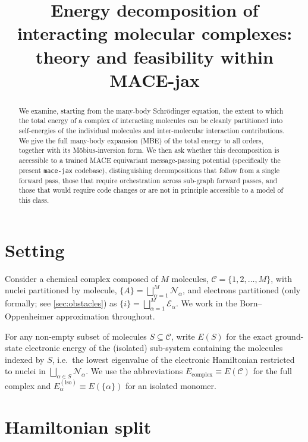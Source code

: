 \documentclass[11pt,a4paper]{article}
\title{Energy decomposition of interacting molecular complexes:\\
theory and feasibility within \textsc{MACE}-jax}
\author{}
\date{}
\newcommand{\Eiso}{E^{(\mathrm{iso})}}
\newcommand{\Ecpl}{E_{\mathrm{complex}}}
\begin{document}
\maketitle

\begin{abstract}
We examine, starting from the many-body Schr\"odinger equation, the extent to
which the total energy of a complex of interacting molecules can be cleanly
partitioned into self-energies of the individual molecules and inter-molecular
interaction contributions. We give the full many-body expansion (MBE) of the
total energy to all orders, together with its M\"obius-inversion form. We then
ask whether this decomposition is accessible to a trained \textsc{MACE}
equivariant message-passing potential (specifically the present
\texttt{mace-jax} codebase), distinguishing decompositions that follow from a
single forward pass, those that require orchestration across sub-graph forward
passes, and those that would require code changes or are not in principle
accessible to a model of this class.
\end{abstract}

\section{Setting}

Consider a chemical complex composed of $M$ molecules,
$\mathcal{C} = \{1, 2, \dots, M\}$, with nuclei partitioned by molecule,
$\{A\} = \bigsqcup_{\alpha=1}^{M} \mathcal{N}_\alpha$,
and electrons partitioned (only formally; see \cref{sec:obstacles}) as
$\{i\} = \bigsqcup_{\alpha=1}^{M} \mathcal{E}_\alpha$.
We work in the Born--Oppenheimer approximation throughout.

For any non-empty subset of molecules
$S \subseteq \mathcal{C}$, write $E(S)$ for the exact ground-state electronic
energy of the (isolated) sub-system containing the molecules indexed by $S$,
i.e.\ the lowest eigenvalue of the electronic Hamiltonian restricted to nuclei
in $\bigsqcup_{\alpha \in S} \mathcal{N}_\alpha$. We use the abbreviations
$\Ecpl \equiv E(\mathcal{C})$ for the full complex and
$\Eiso_\alpha \equiv E(\{\alpha\})$ for an isolated monomer.

\section{Hamiltonian split}
\end{document}
